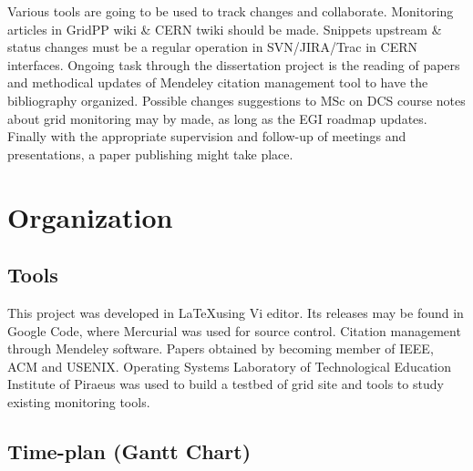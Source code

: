 Various tools are going to be used to track changes and collaborate. Monitoring articles in GridPP wiki \& CERN twiki should be made. Snippets upstream \& status changes must be a regular operation in SVN/JIRA/Trac in CERN interfaces. Ongoing task through the dissertation project is the reading of papers and methodical updates of Mendeley citation management tool to have the bibliography organized. Possible changes suggestions to MSc on DCS course notes about grid monitoring may by made, as long as the EGI roadmap updates. Finally with the appropriate supervision and follow-up of meetings and presentations, a paper publishing might take place.

\section{Organization}

\subsection[Tools]{Tools}
This project was developed in \LaTeX using Vi editor. Its releases may be found in Google Code, where Mercurial was used for source control. Citation management through Mendeley software. Papers obtained by becoming member of IEEE, ACM and USENIX. Operating Systems Laboratory of Technological Education Institute of Piraeus was used to build a testbed of grid site and tools to study existing monitoring tools.


\subsection[Time plan]{Time-plan (Gantt Chart)}

